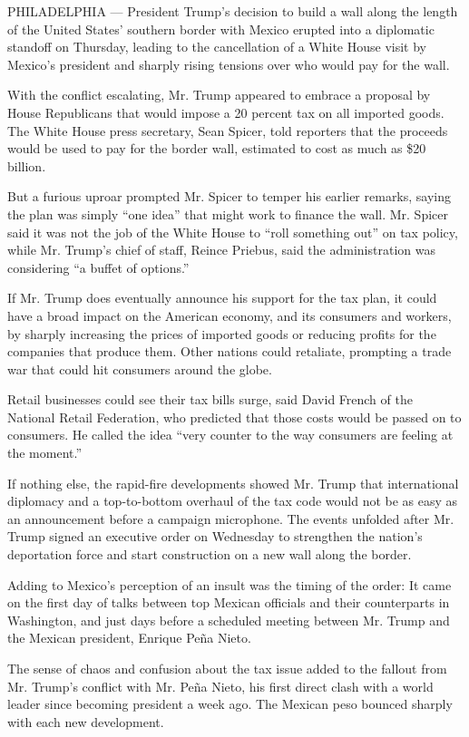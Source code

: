 PHILADELPHIA --- President Trump's decision to build a wall along the
length of the United States' southern border with Mexico erupted into a
diplomatic standoff on Thursday, leading to the cancellation of a White
House visit by Mexico's president and sharply rising tensions over who
would pay for the wall.

With the conflict escalating, Mr. Trump appeared to embrace a proposal
by House Republicans that would impose a 20 percent tax on all imported
goods. The White House press secretary, Sean Spicer, told reporters that
the proceeds would be used to pay for the border wall, estimated to cost
as much as \$20 billion.

But a furious uproar prompted Mr. Spicer to temper his earlier remarks,
saying the plan was simply ``one idea'' that might work to finance the
wall. Mr. Spicer said it was not the job of the White House to ``roll
something out'' on tax policy, while Mr. Trump's chief of staff, Reince
Priebus, said the administration was considering ``a buffet of
options.''

If Mr. Trump does eventually announce his support for the tax plan, it
could have a broad impact on the American economy, and its consumers and
workers, by sharply increasing the prices of imported goods or reducing
profits for the companies that produce them. Other nations could
retaliate, prompting a trade war that could hit consumers around the
globe.

Retail businesses could see their tax bills surge, said David French of
the National Retail Federation, who predicted that those costs would be
passed on to consumers. He called the idea ``very counter to the way
consumers are feeling at the moment.''

If nothing else, the rapid-fire developments showed Mr. Trump that
international diplomacy and a top-to-bottom overhaul of the tax code
would not be as easy as an announcement before a campaign microphone.
The events unfolded after Mr. Trump signed an executive order on
Wednesday to strengthen the nation's deportation force and start
construction on a new wall along the border.

Adding to Mexico's perception of an insult was the timing of the order:
It came on the first day of talks between top Mexican officials and
their counterparts in Washington, and just days before a scheduled
meeting between Mr. Trump and the Mexican president, Enrique Peña Nieto.

The sense of chaos and confusion about the tax issue added to the
fallout from Mr. Trump's conflict with Mr. Peña Nieto, his first direct
clash with a world leader since becoming president a week ago. The
Mexican peso bounced sharply with each new development.

